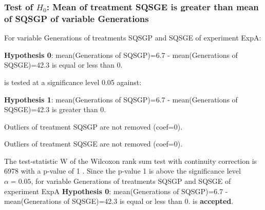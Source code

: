 \begin{frame}[t]
 \frametitle{Test of $H_{0}$: Mean of treatment SQSGE is greater than mean of SQSGP of variable Generations }
 \scriptsize
 For variable Generations of treatments SQSGP and SQSGE of experiment ExpA:

\vspace{1mm}
{\bf Hypothesis 0}: mean(Generations of SQSGP)=6.7 - mean(Generations of SQSGE)=42.3 is equal or less than 0.


 \begin{center} is tested at a significance level 0.05 against: \end{center}

{\bf Hypothesis 1}: mean(Generations of SQSGP)=6.7 - mean(Generations of SQSGE)=42.3 is greater than 0.
\vspace{1mm}
\vspace{1mm}

 Outliers of treatment SQSGP  are not removed (coef=0).

 Outliers of treatment SQSGE  are not removed (coef=0).
\vspace{1mm}
 
 The test-statistic W of the Wilcoxon rank sum test with continuity correction is 6978 with a p-value of 1 .
 Since the p-value 1 is above the significance level $\alpha= 0.05 $,
 for variable Generations of treatments SQSGP and SQSGE of experiment ExpA 
 {\bf Hypothesis 0}: mean(Generations of SQSGP)=6.7 - mean(Generations of SQSGE)=42.3 is equal or less than 0.
is {\bf accepted}.

 \end{frame}
